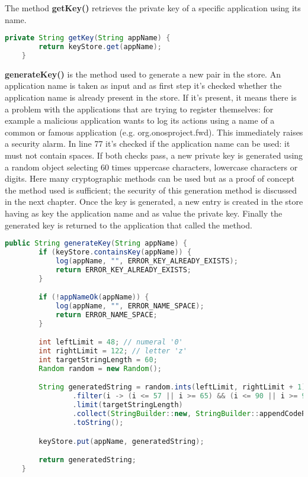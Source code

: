 \documentclass[a4paper,10pt]{memoir}
\begin{document}
The method \textbf{getKey()} retrieves the private key of a specific application using its name.
\begin{lstlisting}[language=java,firstnumber=67]
    private String getKey(String appName) {
        return keyStore.get(appName);
    }
\end{lstlisting}

\textbf{generateKey()} is the method used to generate a new pair in the store. An application name is taken as input and as first step it's checked whether the application name is already present in the store. If it's present, it means there is a problem with the applications that are trying to register themselves: for example a malicious application wants to log its actions using a name of a common or famous application (e.g. org.onosproject.fwd). This immediately raises a security alarm. In line 77 it's checked if the application name can be used: it must not contain spaces. If both checks pass, a new private key is generated using a random object selecting 60 times uppercase characters, lowercase characters or digits. Here many cryptographic methods can be used but as a proof of concept the method used is sufficient; the security of this generation method is discussed in the next chapter. Once the key is generated, a new entry is created in the store having as key the application name and as value the private key. Finally the generated key is returned to the application that called the method.
\begin{lstlisting}[language=java,firstnumber=71]
    public String generateKey(String appName) {
        if (keyStore.containsKey(appName)) {
            log(appName, "", ERROR_KEY_ALREADY_EXISTS);
            return ERROR_KEY_ALREADY_EXISTS;
        }

        if (!appNameOk(appName)) {
            log(appName, "", ERROR_NAME_SPACE);
            return ERROR_NAME_SPACE;
        }

        int leftLimit = 48; // numeral '0'
        int rightLimit = 122; // letter 'z'
        int targetStringLength = 60;
        Random random = new Random();

        String generatedString = random.ints(leftLimit, rightLimit + 1)
                .filter(i -> (i <= 57 || i >= 65) && (i <= 90 || i >= 97))
                .limit(targetStringLength)
                .collect(StringBuilder::new, StringBuilder::appendCodePoint, StringBuilder::append)
                .toString();

        keyStore.put(appName, generatedString);

        return generatedString;
    }
\end{lstlisting}
\end{document}

